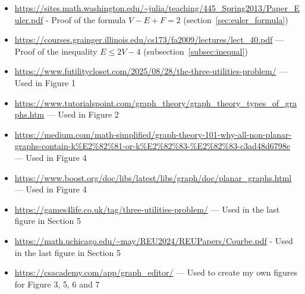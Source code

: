 \documentclass{article}
\begin{document}
\begin{itemize}
  \item     \url{https://sites.math.washington.edu/~julia/teaching/445_Spring2013/Paper_Euler.pdf} - Proof of the formula $V - E + F = 2$ (section~\ref{sec:euler_formula})
  \item \url{https://courses.grainger.illinois.edu/cs173/fa2009/lectures/lect_40.pdf} — Proof of the inequality $ E \leq 2V - 4$ (subsection~\ref{subsec:inequal})
  \item 
  \url{https://www.futilitycloset.com/2025/08/28/the-three-utilities-problem/} — Used in Figure 1
  \item \url{https://www.tutorialspoint.com/graph_theory/graph_theory_types_of_graphs.htm} — Used in Figure 2
  \item 
  \url{https://medium.com/math-simplified/graph-theory-101-why-all-non-planar-graphs-contain-k%E2%82%81-or-k%E2%82%83-%E2%82%83-c3ad48d6798e} — Used in Figure 4
  \item \url{https://www.boost.org/doc/libs/latest/libs/graph/doc/planar_graphs.html} — Used in Figure 4
  \item 
  \url{https://games4life.co.uk/tag/three-utilities-problem/} — Used in the last figure in Section 5
  \item \url{https://math.uchicago.edu/~may/REU2024/REUPapers/Courbe.pdf} 
  - Used in the last figure in Section 5
  \item \url{https://csacademy.com/app/graph_editor/} — Used to create my own figures for Figure 3, 5, 6 and 7

\end{itemize}
\end{document}
